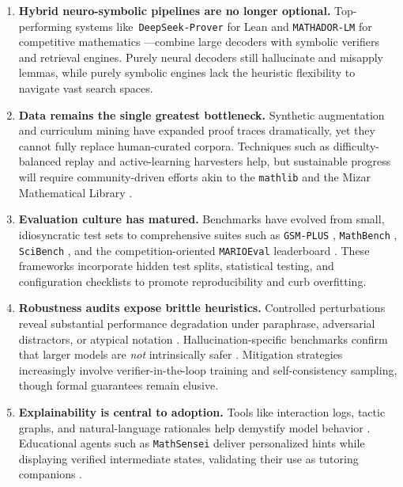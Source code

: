 \documentclass[acmsmall,anonymous]{acmart}
\begin{document}
\begin{enumerate}
    \item \textbf{Hybrid neuro-symbolic pipelines are no longer optional.}  Top-performing systems like\ \texttt{DeepSeek-Prover} for Lean \cite{xin2024deepseek} and \texttt{MATHADOR-LM} for competitive mathematics \cite{kurtic2024mathadorlm}—combine large decoders with symbolic verifiers and retrieval engines.  Purely neural decoders still hallucinate and misapply lemmas, while purely symbolic engines lack the heuristic flexibility to navigate vast search spaces.

    \item \textbf{Data remains the single greatest bottleneck.}  Synthetic augmentation and curriculum mining have expanded proof traces dramatically, yet they cannot fully replace human-curated corpora.  Techniques such as difficulty-balanced replay \cite{florath2024enhancing} and active-learning harvesters help, but sustainable progress will require community-driven efforts akin to the \texttt{mathlib} and the Mizar Mathematical Library \cite{bancerek2018role}.

    \item \textbf{Evaluation culture has matured.}  Benchmarks have evolved from small, idiosyncratic test sets to comprehensive suites such as \texttt{GSM-PLUS} \cite{li2024gsmplus}, \texttt{MathBench} \cite{yang2024mathbench}, \texttt{SciBench} \cite{chen2024scibench}, and the competition-oriented \texttt{MARIOEval} leaderboard \cite{zhang2024marioeval}.  These frameworks incorporate hidden test splits, statistical testing, and configuration checklists to promote reproducibility and curb overfitting.

    \item \textbf{Robustness audits expose brittle heuristics.}  Controlled perturbations reveal substantial performance degradation under paraphrase, adversarial distractors, or atypical notation \cite{frieder2023mathematical,huang2023large}.  Hallucination-specific benchmarks confirm that larger models are \emph{not} intrinsically safer \cite{sun2024benchmarking}.  Mitigation strategies increasingly involve verifier-in-the-loop training and self-consistency sampling, though formal guarantees remain elusive.

    \item \textbf{Explainability is central to adoption.}  Tools like interaction logs, tactic graphs, and natural-language rationales help demystify model behavior \cite{clark2021all}.  Educational agents such as \texttt{MathSensei} deliver personalized hints while displaying verified intermediate states, validating their use as tutoring companions \cite{sun2024mathsensei}.


\end{enumerate}
\end{document}
